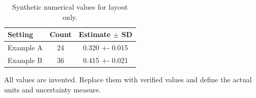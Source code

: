 \documentclass[11pt,a4paper]{article}
\begin{document}
\begin{table}[htbp]
\centering\small
\caption{Synthetic numerical values for layout only.}
\label{tab:si-numeric}
\begin{tabularx}{\linewidth}{@{}>{\raggedright\arraybackslash}X
 S[table-format=2.0] S[table-format=1.3(3)]@{}}
\toprule
Setting & {Count} & {Estimate $\pm$ SD}\\
\midrule
Example A & 24 & 0.320 +- 0.015\\
Example B & 36 & 0.415 +- 0.021\\
\bottomrule
\end{tabularx}
\par\smallskip\footnotesize\raggedright
All values are invented. Replace them with verified values and define the
actual units and uncertainty measure.
\end{table}
\end{document}
